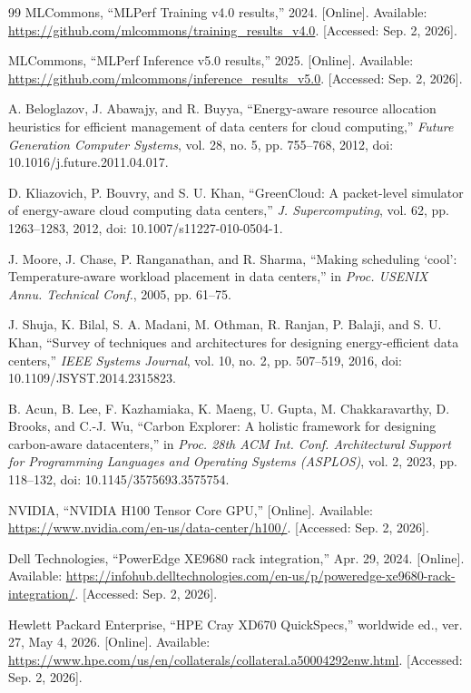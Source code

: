 \begin{thebibliography}{99}
\label{ref:10}
MLCommons, ``MLPerf Training v4.0 results,'' 2024. [Online]. Available: \url{https://github.com/mlcommons/training_results_v4.0}. [Accessed: Sep. 2, 2026].

\label{ref:11}
MLCommons, ``MLPerf Inference v5.0 results,'' 2025. [Online]. Available: \url{https://github.com/mlcommons/inference_results_v5.0}. [Accessed: Sep. 2, 2026].

\label{ref:12}
A. Beloglazov, J. Abawajy, and R. Buyya, ``Energy-aware resource allocation heuristics for efficient management of data centers for cloud computing,'' \emph{Future Generation Computer Systems}, vol. 28, no. 5, pp. 755--768, 2012, doi: 10.1016/j.future.2011.04.017.

\label{ref:13}
D. Kliazovich, P. Bouvry, and S. U. Khan, ``GreenCloud: A packet-level simulator of energy-aware cloud computing data centers,'' \emph{J. Supercomputing}, vol. 62, pp. 1263--1283, 2012, doi: 10.1007/s11227-010-0504-1.

\label{ref:14}
J. Moore, J. Chase, P. Ranganathan, and R. Sharma, ``Making scheduling `cool': Temperature-aware workload placement in data centers,'' in \emph{Proc. USENIX Annu. Technical Conf.}, 2005, pp. 61--75.

\label{ref:15}
J. Shuja, K. Bilal, S. A. Madani, M. Othman, R. Ranjan, P. Balaji, and S. U. Khan, ``Survey of techniques and architectures for designing energy-efficient data centers,'' \emph{IEEE Systems Journal}, vol. 10, no. 2, pp. 507--519, 2016, doi: 10.1109/JSYST.2014.2315823.

\label{ref:16}
B. Acun, B. Lee, F. Kazhamiaka, K. Maeng, U. Gupta, M. Chakkaravarthy, D. Brooks, and C.-J. Wu, ``Carbon Explorer: A holistic framework for designing carbon-aware datacenters,'' in \emph{Proc. 28th ACM Int. Conf. Architectural Support for Programming Languages and Operating Systems (ASPLOS)}, vol. 2, 2023, pp. 118--132, doi: 10.1145/3575693.3575754.

\label{ref:17}
NVIDIA, ``NVIDIA H100 Tensor Core GPU,'' [Online]. Available: \url{https://www.nvidia.com/en-us/data-center/h100/}. [Accessed: Sep. 2, 2026].

\label{ref:18}
Dell Technologies, ``PowerEdge XE9680 rack integration,'' Apr. 29, 2024. [Online]. Available: \url{https://infohub.delltechnologies.com/en-us/p/poweredge-xe9680-rack-integration/}. [Accessed: Sep. 2, 2026].

\label{ref:19}
Hewlett Packard Enterprise, ``HPE Cray XD670 QuickSpecs,'' worldwide ed., ver. 27, May 4, 2026. [Online]. Available: \url{https://www.hpe.com/us/en/collaterals/collateral.a50004292enw.html}. [Accessed: Sep. 2, 2026].

\end{thebibliography}
